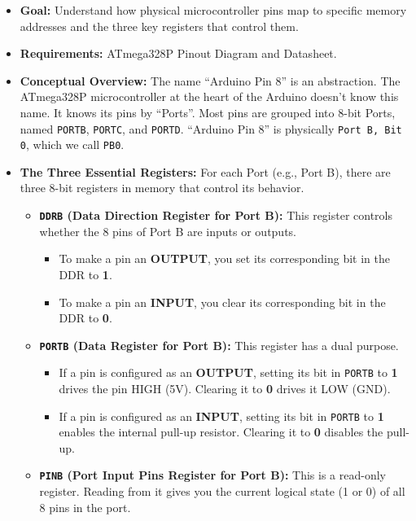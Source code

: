 \documentclass[11pt,a4paper]{article}
\begin{document}
\begin{itemize}
    \item \textbf{Goal:} Understand how physical microcontroller pins map to specific memory addresses and the three key registers that control them.
    \item \textbf{Requirements:} ATmega328P Pinout Diagram and Datasheet.
    \item \textbf{Conceptual Overview:} The name ``Arduino Pin 8'' is an abstraction. The ATmega328P microcontroller at the heart of the Arduino doesn't know this name. It knows its pins by ``Ports''. Most pins are grouped into 8-bit Ports, named \verb|PORTB|, \verb|PORTC|, and \verb|PORTD|. ``Arduino Pin 8'' is physically \verb|Port B, Bit 0|, which we call \verb|PB0|.
    \item \textbf{The Three Essential Registers:} For each Port (e.g., Port B), there are three 8-bit registers in memory that control its behavior.
    \begin{itemize}
        \item \textbf{\texttt{DDRB} (Data Direction Register for Port B):} This register controls whether the 8 pins of Port B are inputs or outputs.
            \begin{itemize}
                \item To make a pin an \textbf{OUTPUT}, you set its corresponding bit in the DDR to \textbf{1}.
                \item To make a pin an \textbf{INPUT}, you clear its corresponding bit in the DDR to \textbf{0}.
            \end{itemize}
        \item \textbf{\texttt{PORTB} (Data Register for Port B):} This register has a dual purpose.
            \begin{itemize}
                \item If a pin is configured as an \textbf{OUTPUT}, setting its bit in \verb|PORTB| to \textbf{1} drives the pin HIGH (5V). Clearing it to \textbf{0} drives it LOW (GND).
                \item If a pin is configured as an \textbf{INPUT}, setting its bit in \verb|PORTB| to \textbf{1} enables the internal pull-up resistor. Clearing it to \textbf{0} disables the pull-up.
            \end{itemize}
        \item \textbf{\texttt{PINB} (Port Input Pins Register for Port B):} This is a read-only register. Reading from it gives you the current logical state (1 or 0) of all 8 pins in the port.

\end{itemize}
\end{itemize}
\end{document}

